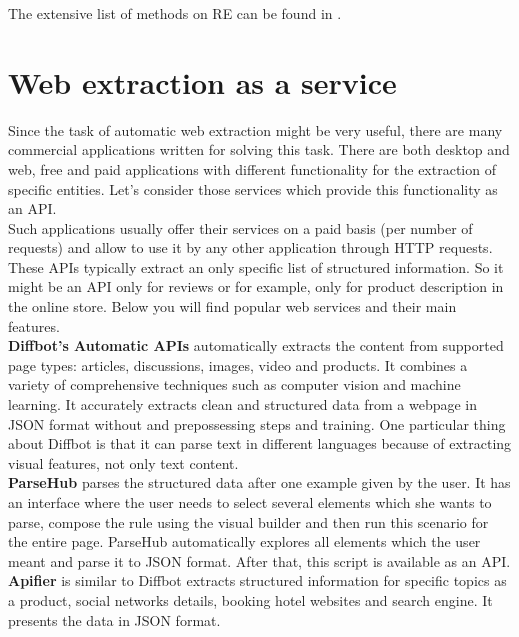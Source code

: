 The extensive list of methods on RE can be found in \cite{RegExtrSurvey}. 

\section{Web extraction as a service}

Since the task of automatic web extraction might be very useful, there are many commercial applications written for solving this task. There are both desktop and web, free and paid applications with different functionality for the extraction of specific entities. Let's consider those services which provide this functionality as an API.\\

Such applications usually offer their services on a paid basis (per number of requests) and allow to use it by any other application through HTTP requests. These APIs typically extract an only specific list of structured information. So it might be an API only for reviews or for example, only for product description in the online store. Below you will find popular web services and their main features.\\

\noindent \textbf{Diffbot's Automatic APIs} \cite{Diffbot} automatically extracts the content from supported page types: articles, discussions, images, video and products. It combines a variety of comprehensive techniques such as computer vision and machine learning. It accurately extracts clean and structured data from a webpage in JSON format without and prepossessing steps and training. One particular thing about Diffbot is that it can parse text in different languages because of extracting visual features, not only text content.\\

\noindent\textbf{ParseHub}\cite{ParseHub} parses the structured data after one example given by the user. It has an interface where the user needs to select several elements which she wants to parse, compose the rule using the visual builder and then run this scenario for the entire page. ParseHub automatically explores all elements which the user meant and parse it to JSON format. After that, this script is available as an API.\\

\noindent\textbf{Apifier} \cite{Apifier} is similar to Diffbot extracts structured information for specific topics as a product, social networks details, booking hotel websites and search engine. It presents the data in JSON format.\\

